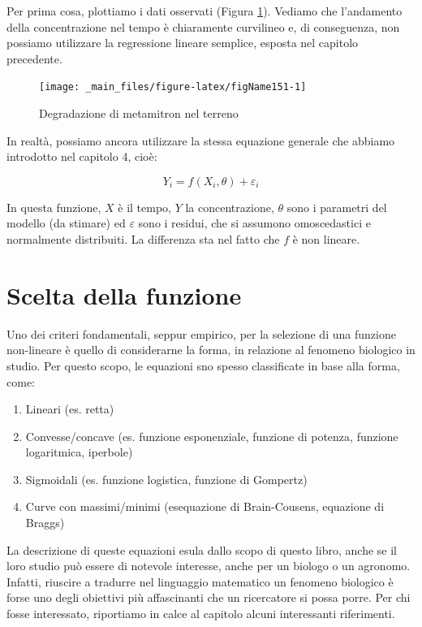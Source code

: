 \documentclass[a4paper,12pt,oneside]{book}
\providecommand{\tightlist}{%
  \setlength{\itemsep}{0pt}\setlength{\parskip}{0pt}}
\begin{document}
Per prima cosa, plottiamo i dati osservati (Figura \ref{fig:figName151}). Vediamo che l'andamento della concentrazione nel tempo è chiaramente curvilineo e, di conseguenza, non possiamo utilizzare la regressione lineare semplice, esposta nel capitolo precedente.

\begin{figure}

{\centering \texttt{[image: \_main\_files/figure-latex/figName151-1]} 

}

\caption{Degradazione di metamitron nel terreno}\label{fig:figName151}
\end{figure}

In realtà, possiamo ancora utilizzare la stessa equazione generale che abbiamo introdotto nel capitolo 4, cioè:

\[ Y_i = f(X_i, \theta) + \varepsilon_i \]

In questa funzione, \(X\) è il tempo, \(Y\) la concentrazione, \(\theta\) sono i parametri del modello (da stimare) ed \(\varepsilon\) sono i residui, che si assumono omoscedastici e normalmente distribuiti. La differenza sta nel fatto che \(f\) è non lineare.

\hypertarget{scelta-della-funzione}{%
\section{Scelta della funzione}\label{scelta-della-funzione}}

Uno dei criteri fondamentali, seppur empirico, per la selezione di una funzione non-lineare è quello di considerarne la forma, in relazione al fenomeno biologico in studio. Per questo scopo, le equazioni sno spesso classificate in base alla forma, come:

\begin{enumerate}
\def\labelenumi{\arabic{enumi}.}
\tightlist
\item
  Lineari (es. retta)
\item
  Convesse/concave (es. funzione esponenziale, funzione di potenza, funzione logaritmica, iperbole)
\item
  Sigmoidali (es. funzione logistica, funzione di Gompertz)
\item
  Curve con massimi/minimi (esequazione di Brain-Cousens, equazione di Braggs)
\end{enumerate}

La descrizione di queste equazioni esula dallo scopo di questo libro, anche se il loro studio può essere di notevole interesse, anche per un biologo o un agronomo. Infatti, riuscire a tradurre nel linguaggio matematico un fenomeno biologico è forse uno degli obiettivi più affascinanti che un ricercatore si possa porre. Per chi fosse interessato, riportiamo in calce al capitolo alcuni interessanti riferimenti.
\end{document}
